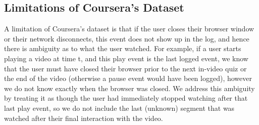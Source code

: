 \documentclass{sigchi}
\begin{document}

\subsection{Limitations of Coursera's Dataset}

A limitation of Coursera's dataset is that if the user closes their browser window or their network disconnects, this event does not show up in the log, and hence there is ambiguity as to what the user watched. For example, if a user starts playing a video at time t, and this play event is the last logged event, we know that the user must have closed their browser prior to the next in-video quiz or the end of the video (otherwise a pause event would have been logged), however we do not know exactly when the browser was closed. We address this ambiguity by treating it as though the user had immediately stopped watching after that last play event, so we do not include the last (unknown) segment that was watched after their final interaction with the video. %




\end{document}
